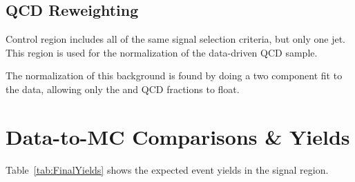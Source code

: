 \subsection{QCD Reweighting}


Control region includes all of the same signal selection criteria, but only one jet.
This region is used for the normalization of the data-driven QCD sample.


The normalization of this background is found by doing a two component fit to the data, allowing only the \Wjets and QCD fractions to float.



\section{Data-to-MC Comparisons \& Yields}

Table~\ref{tab:FinalYields} shows the expected event yields in the signal region.

